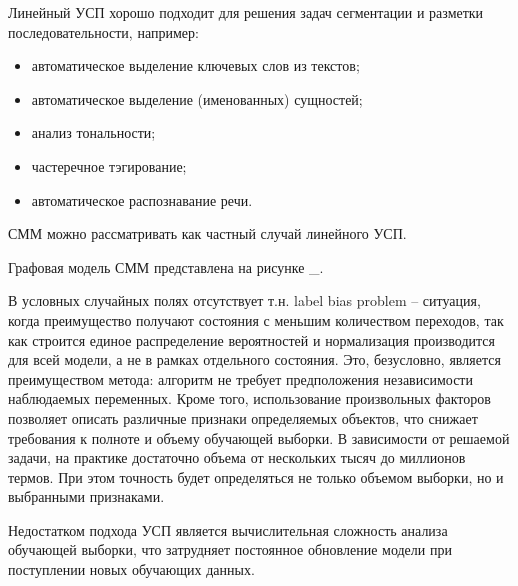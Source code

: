 Линейный УСП хорошо подходит для решения задач сегментации и разметки последовательности, например:
\begin{itemize}
\item автоматическое выделение ключевых слов из текстов;
\item автоматическое выделение (именованных) сущностей;
\item анализ тональности;
\item частеречное тэгирование;
\item автоматическое распознавание речи.
\end{itemize}

СММ можно рассматривать как частный случай линейного УСП.

Графовая модель СММ представлена на рисунке \_.

\begin{center}
\end{center}

В условных случайных полях отсутствует т.н. label bias problem – ситуация, когда преимущество получают состояния с меньшим количеством переходов, так как строится единое распределение вероятностей и нормализация производится для всей модели, а не в рамках отдельного состояния. Это, безусловно, является преимуществом метода: алгоритм не требует предположения независимости наблюдаемых переменных. Кроме того, использование произвольных факторов позволяет описать различные признаки определяемых объектов, что снижает требования к полноте и объему обучающей выборки. В зависимости от решаемой задачи, на практике достаточно объема от нескольких тысяч до миллионов термов. При этом точность будет определяться не только объемом выборки, но и выбранными признаками.

Недостатком подхода УСП является вычислительная сложность анализа обучающей выборки, что затрудняет постоянное обновление модели при поступлении новых обучающих данных.

